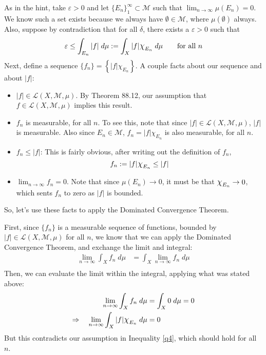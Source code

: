 \documentclass[12pt]{article}
\theoremstyle{plain}
\theoremstyle{definition}
\theoremstyle{remark}
\newcommand*{\Chi}{\mbox{\large$\chi$}} %
\begin{document}
\begin{enumerate}
As in the hint, take $\varepsilon>0$ and let $\{E_n\}^\infty_1 \subset \mathscr{M}$ such that $\lim_{n\rightarrow\infty} \mu(E_n)=0$. We know such a set exists because we always have $\emptyset \in \mathscr{M}$, where $\mu(\emptyset)$ always. Also, suppose by contradiction that for all $\delta$, there exists a $\varepsilon>0$ such that 
\begin{equation}
    \label{q4}
    \varepsilon\leq \int_{E_n} |f| \; d\mu :=
    \int_X |f|\Chi_{E_n} \; d\mu
    \qquad\text{for all $n$}
\end{equation}
Next, define a sequence $\{f_n\}=\left\{|f|\chi_{E_n}\right\}$. A couple facts about our sequence and about $|f|$:
\begin{itemize}
    \item $|f|\in\mathscr{L}(X,\mathscr{M},\mu)$. By Theorem 88.12, our assumption that $f\in\mathscr{L}(X,\mathscr{M},\mu)$ implies this result.
    \item $f_n$ is measurable, for all $n$. To see this, note that since $|f|\in\mathscr{L}(X,\mathscr{M},\mu)$, $|f|$ is measurable. Also since $E_n\in\mathscr{M}$, $f_n = |f|\chi_{E_n}$ is also measurable, for all $n$.
    \item $f_n \leq |f|$: This is fairly obvious, after writing out the definition of $f_n$, 
\begin{equation}
    \label{dtcapply}
    f_n := |f|\Chi_{E_n}\leq |f|
\end{equation}
    \item $\lim_{n\rightarrow\infty}f_n=0$. Note that since $\mu(E_n)\rightarrow 0$, it must be that $\Chi_{E_n}\rightarrow 0$, which sents $f_n$ to zero as $|f|$ is bounded.
\end{itemize}
So, let's use these facts to apply the Dominated Convergence Theorem. 

First, since $\{f_n\}$ is a measurable sequence of functions, bounded by $|f|\in\mathscr{L}(X,\mathscr{M},\mu)$ for all $n$, we know that we can apply the Dominated Convergence Theorem, and exchange the limit and integral:
\begin{align*}
    \lim_{n\rightarrow\infty} \int_X f_n \; d\mu&=
    \int_X \lim_{n\rightarrow\infty}f_n \; d\mu  \\ 
\end{align*}
Then, we can evaluate the limit within the integral, applying what was stated above:
\begin{align*}
    \lim_{n\rightarrow\infty} \int_X f_n \; d\mu &=
    \int_X 0 \; d\mu = 0 \\ 
    \Rightarrow\quad
    \lim_{n\rightarrow\infty} \int_X |f|\Chi_{E_n} \; 
    d\mu &= 0
\end{align*}
But this contradicts our assumption in Inequality \ref{q4}, which should hold for all $n$.



\end{enumerate}
\end{document}
